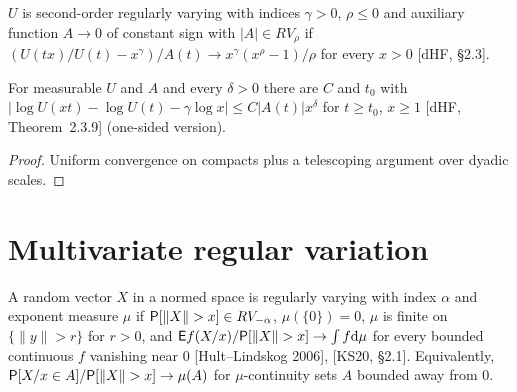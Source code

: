 \begin{definition}
  \label{def:second-order-rv}
  \leanok
  $U$ is second-order regularly varying with indices $\gamma > 0$, $\rho \le 0$ and auxiliary function
  $A \to 0$ of constant sign with $|A| \in RV_\rho$ if
  $(U(tx)/U(t) - x^\gamma)/A(t) \to x^\gamma (x^\rho - 1)/\rho$ for every $x > 0$ [dHF, \S2.3].
\end{definition}

\begin{theorem}
  \label{thm:second-order-bound}
  \leanok
  For measurable $U$ and $A$ and every $\delta > 0$ there are $C$ and $t_0$ with
  $|\log U(xt) - \log U(t) - \gamma \log x| \le C |A(t)| x^\delta$ for $t \ge t_0$, $x \ge 1$
  [dHF, Theorem~2.3.9] (one-sided version).
\end{theorem}
\begin{proof}
  \leanok
  Uniform convergence on compacts plus a telescoping argument over dyadic scales.
\end{proof}

\section{Multivariate regular variation}

\begin{definition}
  \label{def:rv-vector}
  \leanok
  A random vector $X$ in a normed space is regularly varying with index $\alpha$ and exponent measure
  $\mu$ if $\mathsf{P}[\|X\| > x] \in RV_{-\alpha}$, $\mu(\{0\}) = 0$, $\mu$ is finite on
  $\{\|y\| > r\}$ for $r > 0$, and $\mathsf{E} f(X/x) / \mathsf{P}[\|X\| > x] \to \int f \mathrm{d}\mu$ for every bounded
  continuous $f$ vanishing near $0$ [Hult--Lindskog 2006], [KS20, \S2.1]. Equivalently,
  $\mathsf{P}[X/x \in A]/\mathsf{P}[\|X\| > x] \to \mu(A)$ for $\mu$-continuity sets $A$ bounded away from $0$.
\end{definition}

